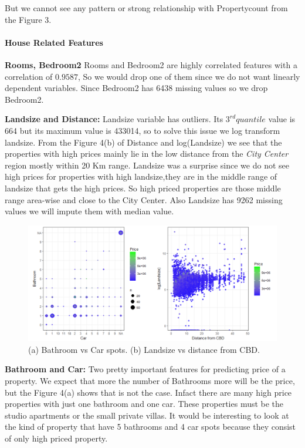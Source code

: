 \documentclass[]{article}
\let\oldparagraph\paragraph
\renewcommand{\paragraph}[1]{\oldparagraph{#1}\mbox{}}
\begin{document}
But we cannot see any pattern or strong relationship with Propertycount
from the Figure 3.

\paragraph{House Related Features}\label{house-related-features}

\textbf{Rooms, Bedroom2} Rooms and Bedroom2 are highly correlated
features with a correlation of \(0.9587\), So we would drop one of them
since we do not want linearly dependent variables. Since Bedroom2 has
6438 missing values so we drop Bedroom2.

\textbf{Landsize and Distance:} Landsize variable has outliers. Its
\(3^{rd} quantile\) value is 664 but its maximum value is 433014, so to
solve this issue we log transform landsize. From the Figure 4(b) of
Distance and log(Landsize) we see that the properties with high prices
mainly lie in the low distance from the \emph{City Center} region mostly
within 20 Km range. Landsize was a surprise since we do not see high
prices for properties with high landsize,they are in the middle range of
landsize that gets the high prices. So high priced properties are those
middle range area-wise and close to the City Center. Also Landsize has
9262 missing values we will impute them with median value.

\begin{figure}
\centering
\includegraphics{Report_files/figure-latex/unnamed-chunk-4-1.pdf}
\caption{(a) Bathroom vs Car spots. (b) Landsize vs distance from CBD.}
\end{figure}

\textbf{Bathroom and Car:} Two pretty important features for predicting
price of a property. We expect that more the number of Bathrooms more
will be the price, but the Figure 4(a) shows that is not the case.
Infact there are many high price properties with just one bathroom and
one car. These properties must be the studio apartments or the small
private villas. It would be interesting to look at the kind of property
that have 5 bathrooms and 4 car spots because they consist of only high
priced property.
\end{document}
